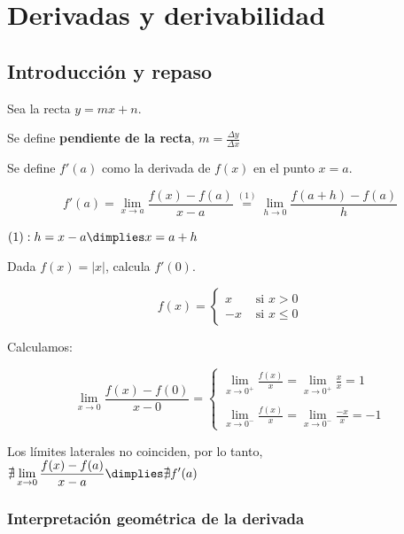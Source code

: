 \section{Derivadas y derivabilidad}


\subsection{Introducción y repaso}
\begin{defn}
Sea la recta $y=mx+n$.

Se define \textbf{pendiente de la recta}, $m=\frac{\Delta y}{\Delta x}$
\end{defn}

\begin{defn}
Se define $f'(a)$ como la derivada de $f(x)$ en el punto $x=a$.

\[f'(a) = \lim_{x\to a}\frac{f(x)-f(a)}{x-a} \overset{(1)}{=} \lim_{h\to 0}\frac{f(a+h)-f(a)}{h}\]

$(1): h=x-a \dimplies x=a+h$

\end{defn}


\begin{example}
Dada $f(x) = |x|$, calcula $f'(0)$.

\[
f(x) = \begin{cases}x&\text{ si } x>0 \\ -x & \text{ si }x\leq 0\end{cases}
\]

Calculamos:

\[
\lim_{x\to 0}\frac{f(x)-f(0)}{x-0} = \begin{cases}
\displaystyle\lim_{x\to 0^+} \frac{f(x)}{x} = \displaystyle\lim_{x\to 0^+} \frac{x}{x} = 1\\\\
\displaystyle\lim_{x\to 0^-} \frac{f(x)}{x} = \displaystyle\lim_{x\to 0^-} \frac{-x}{x} = -1
\end{cases}
\]

\label{derivEjemplo}

Los límites laterales no coinciden, por lo tanto, $\nexists \displaystyle\lim_{x\to 0}\frac{f(x)-f(a)}{x-a} \dimplies \nexists f'(a)$
\end{example}


\subsubsection{Interpretación geométrica de la derivada}

